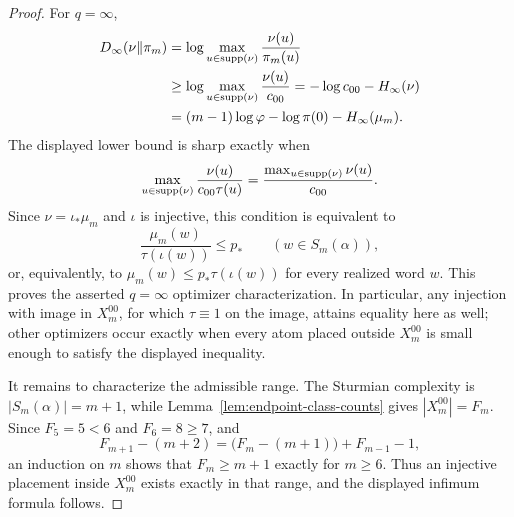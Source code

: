 \begin{proof}
For \(q=\infty\),
\[
\begin{aligned}
D_\infty(\nu\|\pi_m)
&=
\log\max_{u\in\operatorname{supp}(\nu)}\frac{\nu(u)}{\pi_m(u)}\\
&\ge
\log\max_{u\in\operatorname{supp}(\nu)}\frac{\nu(u)}{c_{00}}
=
-\log c_{00}-H_\infty(\nu)\\
&=
(m-1)\log\varphi-\log\pi(0)-H_\infty(\mu_m).
\end{aligned}
\]
The displayed lower bound is sharp exactly when
\[
\max_{u\in\operatorname{supp}(\nu)}\frac{\nu(u)}{c_{00}\tau(u)}
=
\frac{\max_{u\in\operatorname{supp}(\nu)}\nu(u)}{c_{00}}.
\]
Since \(\nu=\iota_*\mu_m\) and \(\iota\) is injective, this condition is
equivalent to
\[
\frac{\mu_m(w)}{\tau(\iota(w))}\le p_*
\qquad (w\in S_m(\alpha)),
\]
or, equivalently, to
\(\mu_m(w)\le p_*\tau(\iota(w))\) for every realized word \(w\).  This proves
the asserted \(q=\infty\) optimizer characterization.  In particular, any
injection with image in \(X_m^{00}\), for which \(\tau\equiv1\) on the image,
attains equality here as well; other optimizers occur exactly when every atom
placed outside \(X_m^{00}\) is small enough to satisfy the displayed
inequality.

It remains to characterize the admissible range. The Sturmian complexity is
\(|S_m(\alpha)|=m+1\), while Lemma~\ref{lem:endpoint-class-counts} gives
\(|X_m^{00}|=F_m\). Since \(F_5=5<6\) and \(F_6=8\ge7\), and
\[
F_{m+1}-(m+2)=\bigl(F_m-(m+1)\bigr)+F_{m-1}-1,
\]
an induction on \(m\) shows that \(F_m\ge m+1\) exactly for \(m\ge6\). Thus
an injective placement inside \(X_m^{00}\) exists exactly in that range, and
the displayed infimum formula follows.
\end{proof}

